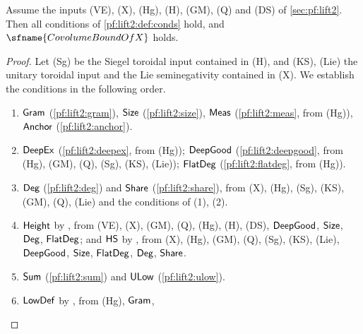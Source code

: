 \begin{theorem}\label{pf:lift2:main}
Assume the inputs \textup{(VE)}, \textup{(X)}, \textup{(Hg)}, \textup{(H)}, \textup{(GM)}, \textup{(Q)} and \textup{(DS)} of \cref{sec:pf:lift2}. Then all conditions of
\cref{pf:lift2:def:conds} hold, and $\sfname{CovolumeBoundOfX}$ holds.
\end{theorem}

\begin{proof}
Let \textup{(Sg)} be the Siegel toroidal input contained in \textup{(H)}, and \textup{(KS)}, \textup{(Lie)} the unitary toroidal input and the Lie
seminegativity contained in \textup{(X)}. We establish the conditions in the following order.
\begin{enumerate}[label=(\arabic*)]
\item $\mathsf{Gram}$ (\cref{pf:lift2:gram}), $\mathsf{Size}$ (\cref{pf:lift2:size}), $\mathsf{Meas}$
(\cref{pf:lift2:meas}, from \textup{(Hg)}), $\mathsf{Anchor}$ (\cref{pf:lift2:anchor}).
\item $\mathsf{DeepEx}$ (\cref{pf:lift2:deepex}, from \textup{(Hg)}); $\mathsf{DeepGood}$ (\cref{pf:lift2:deepgood}, from
\textup{(Hg)}, \textup{(GM)}, \textup{(Q)}, \textup{(Sg)}, \textup{(KS)}, \textup{(Lie)}); $\mathsf{FlatDeg}$ (\cref{pf:lift2:flatdeg}, from \textup{(Hg)}).
\item $\mathsf{Deg}$ (\cref{pf:lift2:deg}) and $\mathsf{Share}$ (\cref{pf:lift2:share}), from \textup{(X)}, \textup{(Hg)}, \textup{(Sg)}, \textup{(KS)},
\textup{(GM)}, \textup{(Q)}, \textup{(Lie)} and the conditions of (1), (2).
\item $\mathsf{Height}$ by , from \textup{(VE)}, \textup{(X)},
\textup{(GM)}, \textup{(Q)}, \textup{(Hg)}, \textup{(H)}, \textup{(DS)}, $\mathsf{DeepGood}$, $\mathsf{Size}$, $\mathsf{Deg}$, $\mathsf{FlatDeg}$; and
$\mathsf{HS}$ by , from \textup{(X)}, \textup{(Hg)}, \textup{(GM)}, \textup{(Q)},
\textup{(Sg)}, \textup{(KS)}, \textup{(Lie)}, $\mathsf{DeepGood}$, $\mathsf{Size}$, $\mathsf{FlatDeg}$, $\mathsf{Deg}$, $\mathsf{Share}$.
\item $\mathsf{Sum}$ (\cref{pf:lift2:sum}) and $\mathsf{ULow}$ (\cref{pf:lift2:ulow}).
\item $\mathsf{LowDef}$ by , from \textup{(Hg)}, $\mathsf{Gram}$,

\end{enumerate}
\end{proof}
